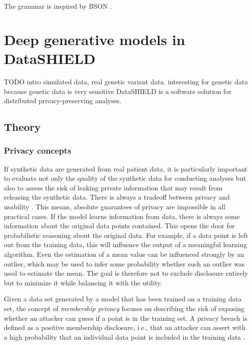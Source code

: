 \documentclass[12pt]{article}
\begin{document}
The grammar is inspired by BSON \citep{bsonspec}.





\FloatBarrier
\section{Deep generative models in DataSHIELD}

TODO intro
simulated data, real genetic variant data.
interesting for genetic data because genetic data is very sensitive
DataSHIELD \citep{budin-ljosne_datashield} is a software solution for distributed privacy-preserving analyses.

\subsection{Theory}

\subsubsection{Privacy concepts}\label{privacyconcepts}
If synthetic data are generated from real patient data, it is particularly important to evaluate not only the quality of the synthetic data for conducting analyses but also to assess the risk of leaking private information that may result from releasing the synthetic data.
There is always a tradeoff between privacy and usability \citep{dinur_revealing_2003, kifer_no_2011}.
This means, absolute guarantees of privacy are impossible in all practical cases.
If the model learns information from data, there is always some information about the original data points contained.
This opens the door for probabilistic reasoning about the original data.
For example, if a data point is left out from the training data, this will influence the output of a meaningful learning algorithm.
Even the estimation of a mean value can be influenced strongly by an outlier, which may be used to infer some probability whether such an outlier was used to estimate the mean.
The goal is therefore not to exclude disclosure entirely but to minimize it while balancing it with the utility.

Given a data set generated by a model that has been trained on a training data set, the concept of {\em membership privacy} \citep{li_membership_2013} focuses on describing the risk of exposing whether an attacker can guess if a point is in the training set. 
A privacy breach is defined as a positive membership disclosure, i.e., that an attacker can assert with a high probability that an individual data point is included in the training data \citep{li_membership_2013}.
\end{document}
